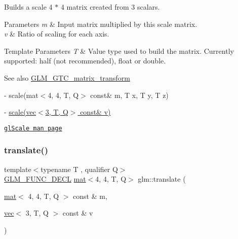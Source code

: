 Builds a scale 4 $\ast$ 4 matrix created from 3 scalars.


\begin{DoxyParams}{Parameters}
{\em m} & Input matrix multiplied by this scale matrix. \\
\hline
{\em v} & Ratio of scaling for each axis. \\
\hline
\end{DoxyParams}

\begin{DoxyTemplParams}{Template Parameters}
{\em T} & Value type used to build the matrix. Currently supported\+: half (not recommended), float or double. \\
\hline
\end{DoxyTemplParams}
\begin{DoxySeeAlso}{See also}
\hyperlink{group__gtc__matrix__transform}{G\+L\+M\+\_\+\+G\+T\+C\+\_\+matrix\+\_\+transform} 

-\/ scale(mat$<$4, 4, T, Q$>$ const\& m, T x, T y, T z) 

-\/ \hyperlink{group__gtx__transform_gafbeefee8fec884d566e4ada0049174d7}{scale(vec$<$3, T, Q$>$ const\& v)} 

\href{https://www.khronos.org/registry/OpenGL-Refpages/gl2.1/xhtml/glScale.xml}{\tt gl\+Scale man page} 
\end{DoxySeeAlso}
\mbox{\label{group__gtc__matrix__transform_ga1a4ecc4ad82652b8fb14dcb087879284}} 
\subsubsection{\texorpdfstring{translate()}{translate()}}
{\footnotesize\ttfamily template$<$typename T , qualifier Q$>$ \\
\hyperlink{setup_8hpp_ab2d052de21a70539923e9bcbf6e83a51}{G\+L\+M\+\_\+\+F\+U\+N\+C\+\_\+\+D\+E\+CL} \hyperlink{structglm_1_1mat}{mat}$<$4, 4, T, Q$>$ glm\+::translate (\begin{DoxyParamCaption}\item[{\hyperlink{structglm_1_1mat}{mat}$<$ 4, 4, T, Q $>$ const \&}]{m,  }\item[{\hyperlink{structglm_1_1vec}{vec}$<$ 3, T, Q $>$ const \&}]{v }\end{DoxyParamCaption})}


